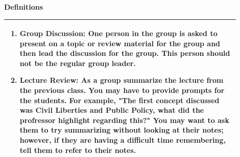\documentclass{article}
\begin{document}
\vspace{0.5cm}
{\large\textbf{Definitions}}
\\
\begin{tabular}{|p{0.9\linewidth}|}
\hline
\begin{minipage}[t]{0.9\linewidth}
\begin{enumerate}
    \item\textbf{Group Discussion:} One person in the group is asked to present on a topic or review material for the group and then lead the discussion for the group. This person should not be the regular group leader.
   \item\textbf{Lecture Review:} As a group summarize the lecture from the previous class. You may have to provide prompts for the students. For example, "The first concept discussed was Civil Liberties and Public Policy, what did the profressor highlight regarding this?" You may want to ask them to try summarizing without looking at their notes; however, if they are having a difficult time remembering, tell them to refer to their notes.
\end{enumerate}
\end{minipage} \\
\hline
\end{tabular}
\end{document}
